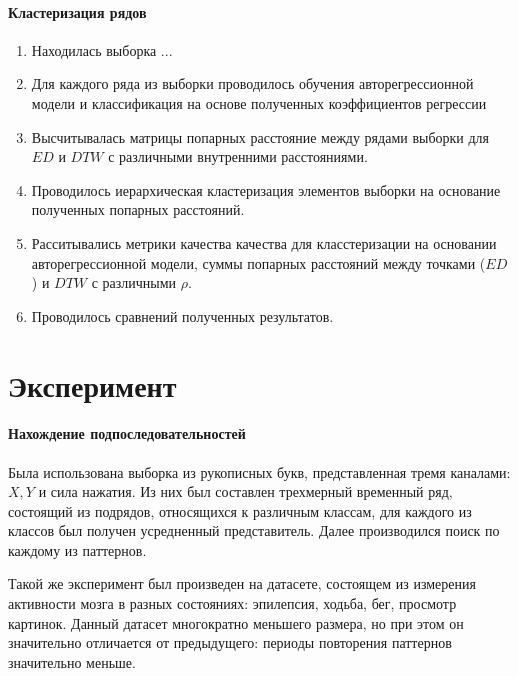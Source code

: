\documentclass[12pt,twoside]{article}
\begin{document}
        \paragraph{Кластеризация рядов}
        \begin{enumerate}
            \item Находилась выборка ... 
            \item Для каждого ряда из выборки проводилось обучения авторегрессионной модели и классификация на основе полученных коэффициентов регрессии
            \item Высчитывалась матрицы попарных расстояние между рядами выборки для $ED$ и $DTW$ с различными внутренними расстояниями.
            \item Проводилось иерархическая кластеризация элементов выборки на основание полученных попарных расстояний.
            \item Расситывались метрики качества качества для класстеризации на основании авторегрессионной модели,
                суммы попарных расстояний между точками ($ED$) и $DTW$ с различными $\rho$.
            \item Проводилось сравнений полученных результатов. 
        \end{enumerate}
									
    \section{Эксперимент}

        \paragraph{Нахождение подпоследовательностей}
        Была использована выборка из рукописных букв, представленная тремя каналами: $X, Y$ и сила нажатия.
        Из них был составлен трехмерный временный ряд, состоящий из подрядов, относящихся к различным классам,
            для каждого из классов был получен усредненный представитель.
        Далее производился поиск по каждому из паттернов.

        Такой же эксперимент был произведен на датасете, состоящем из измерения активности мозга в разных состояниях:
            эпилепсия, ходьба, бег, просмотр картинок.
        Данный датасет многократно меньшего размера, но при этом он значительно отличается от предыдущего:
            периоды повторения паттернов значительно меньше.
        
\end{document}
